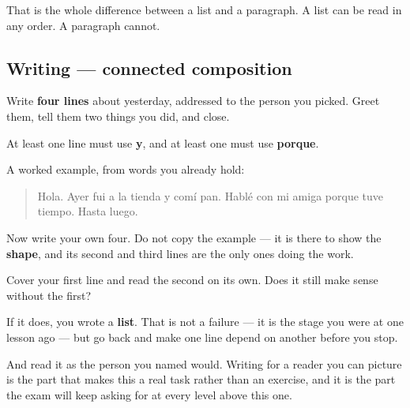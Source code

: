 That is the whole difference between a list and a paragraph. A list can be read in any order. A paragraph cannot.

\subsection*{Writing — connected composition}

Write \textbf{four lines} about yesterday, addressed to the person you picked. Greet them, tell them two things you did, and close.

At least one line must use \textbf{y}, and at least one must use \textbf{porque}.

A worked example, from words you already hold:

\begin{quote}
Hola. Ayer fui a la tienda y comí pan. Hablé con mi amiga porque tuve tiempo. Hasta luego.
\end{quote}

Now write your own four. Do not copy the example — it is there to show the \textbf{shape}, and its second and third lines are the only ones doing the work.

\begin{tcolorbox}[breakable,colback=teal!4,colframe=teal!35!black,title={Before you move on}]
Cover your first line and read the second on its own. Does it still make sense without the first?

If it does, you wrote a \textbf{list}. That is not a failure — it is the stage you were at one lesson ago — but go back and make one line depend on another before you stop.

And read it as the person you named would. Writing for a reader you can picture is the part that makes this a real task rather than an exercise, and it is the part the exam will keep asking for at every level above this one.
\end{tcolorbox}
